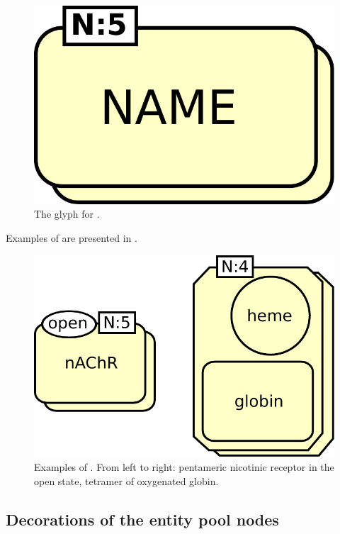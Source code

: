 \begin{figure}[htb]
  \centering
  \includegraphics[scale = 0.3]{le_images/multimer}
  \caption{The \PD glyph for . }
  \label{fig:multimer}
\end{figure}

Examples of  are presented in .

\begin{figure}[htb]
  \centering
  \includegraphics[scale = 0.5]{le_images/multimer-examples}
  \caption{Examples of . From left to right: pentameric nicotinic receptor in the open state, tetramer of oxygenated globin.}
  \label{fig:multimer-examples}
\end{figure}


\subsection{Decorations of the entity pool nodes}\label{sec:decorations}

